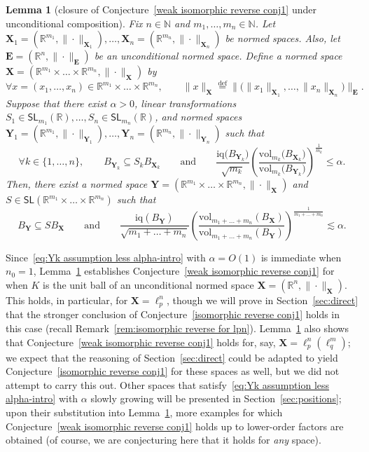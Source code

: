 \documentclass[11pt,reqno]{amsart}
\renewcommand{\le}{\leqslant}
\newcommand{\n}{\{1,\ldots,n\}}
\newcommand{\X}{\mathbf X}
\newcommand{\Y}{\mathbf Y}
\newcommand{\R}{\mathbb R}
\newtheorem{lemma}[theorem]{Lemma}
\theoremstyle{remark}
\newcommand{\iq}{\mathrm{iq}}
\newcommand{\SL}{\mathsf{SL}}
\renewcommand{\subset}{\subseteq}
\newcommand{\N}{\mathbb N}
\newcommand{\eqdef}{\stackrel{\mathrm{def}}{=}}
\newcommand{\vol}{\mathrm{vol}}
\renewcommand{\1}{\mathbf 1}
\newcommand{\bfE}{\mathbf{E}}
\begin{document}
\begin{lemma}[closure of Conjecture~\ref{weak isomorphic reverse conj1} under unconditional composition]\label{lem:unconditional composiiton} Fix $n\in \N$ and $m_1,\ldots,m_n\in \N$. Let $\X_1=(\R^{m_1},\|\cdot\|_{\X_1}),\ldots,\X_n=(\R^{m_n},\|\cdot\|_{\X_{n}})$ be normed spaces. Also, let $\bfE=(\R^n,\|\cdot\|_\bfE)$ be an unconditional normed space. Define a normed space $\X=(\R^{m_1}\times\ldots\times \R^{m_n},\|\cdot\|_\X)$ by
\begin{equation}\label{eq:def composed norm}
\forall x=(x_1,\ldots,x_n)\in \R^{m_1}\times\ldots\times \R^{m_n},\qquad \|x\|_\X\eqdef \big\|\big(\|x_1\|_{\X_1},\ldots,\|x_n\|_{\X_n}\big)\big\|_\bfE.
\end{equation}
Suppose that there exist $\alpha>0$, linear transformations  $S_1\in \SL_{m_1}(\R),\ldots,S_n\in \SL_{m_n}(\R)$, and normed spaces $\Y_1=(\R^{m_1},\|\cdot\|_{\Y_1}),\ldots,\Y_n=(\R^{m_n},\|\cdot\|_{\Y_{n}})$ such that
\begin{equation}\label{eq:Yk assumption less alpha-intro}
\forall k\in \n,\qquad B_{\Y_k}\subset S_kB_{\X_k}\qquad\mathrm{and}\qquad \frac{\iq\big(B_{\Y_k}\big)}{\sqrt{m_k}}\left(\frac{\vol_{m_k}\big(B_{\X_k}\big)}{\vol_{m_k}\big(B_{\Y_k}\big)}\right)^{\frac{1}{m_k}}\le \alpha.
\end{equation}
Then, there exist a normed space $\Y=(\R^{m_1}\times\ldots\times \R^{m_n},\|\cdot\|_\X)$ and $S\in \SL(\R^{m_1}\times\ldots\times \R^{m_n})$ such that
\begin{equation}\label{eq:Y conclusion composition-intro}
B_\Y\subset S B_\X\qquad \mathrm{and}\qquad \frac{\iq(B_{\Y})}{\sqrt{m_1+\ldots+m_n}}\left(\frac{\vol_{m_1+\ldots+m_n}(B_{\X})}{\vol_{m_1+\ldots+m_n}(B_{\Y})}\right)^{\frac{1}{m_1+\ldots+m_n}}\lesssim \alpha.
\end{equation}
\end{lemma}


Since~\eqref{eq:Yk assumption less alpha-intro} with $\alpha=O(1)$ is immediate  when $n_0=1$, Lemma~\ref{lem:unconditional composiiton}   establishes Conjecture~\ref{weak isomorphic reverse conj1} for when $K$ is the unit ball of an unconditional normed space $\X=(\R^n,\|\cdot\|_\X)$. This holds, in particular, for $\X=\ell_p^n$, though we will prove in Section~\ref{sec:direct} that the stronger conclusion of Conjecture~\ref{isomorphic reverse conj1} holds in this case (recall Remark~\ref{rem:isomorphic reverse for lpn}). Lemma~\ref{lem:unconditional composiiton}  also shows that Conjecture~\ref{weak isomorphic reverse conj1} holds for, say, $\X=\ell_p^n(\ell_q^m)$; we expect that the reasoning of Section~\ref{sec:direct} could be adapted to yield Conjecture~\ref{isomorphic reverse conj1} for these spaces as well, but we did not attempt to carry this out. Other  spaces that satisfy~\eqref{eq:Yk assumption less alpha-intro} with $\alpha$ slowly growing will be presented in Section~\ref{sec:positions}; upon their substitution into  Lemma~\ref{lem:unconditional composiiton}, more examples  for which Conjecture~\ref{weak isomorphic reverse conj1} holds up to lower-order factors are obtained (of course, we are conjecturing here that it holds for {\em any} space).
\end{document}
